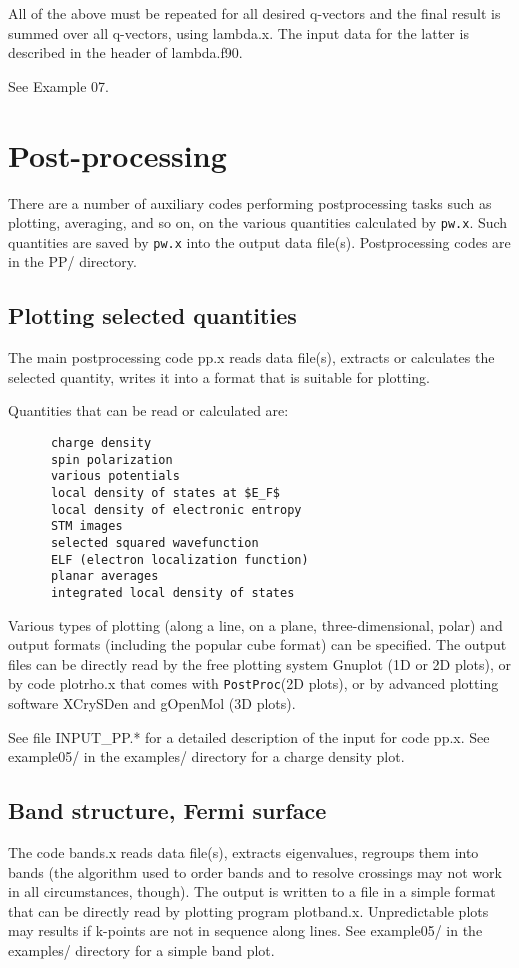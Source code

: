 \documentclass[12pt,a4paper]{article}
\def\pw.x{\texttt{pw.x}}
\def\PostProc{\texttt{PostProc}}
\begin{document}
All of the above must be repeated for all desired q-vectors and the final
result is summed over all q-vectors, using lambda.x. The input
data for the latter is described in the header of lambda.f90.

See Example 07.

\section{Post-processing}

There are a number of auxiliary codes performing postprocessing tasks such
as plotting, averaging, and so on, on the various quantities calculated by
\pw.x. Such quantities are saved by \pw.x into the output data file(s). 
Postprocessing codes are in the PP/ directory.

\subsection{Plotting selected quantities}
  
The main postprocessing code pp.x reads data file(s), extracts or calculates 
the selected quantity, writes it into a format that is suitable for plotting.

Quantities that can be read or calculated are:
\begin{verbatim}
      charge density
      spin polarization
      various potentials
      local density of states at $E_F$
      local density of electronic entropy
      STM images
      selected squared wavefunction
      ELF (electron localization function)
      planar averages
      integrated local density of states
\end{verbatim}
Various types of plotting (along a line, on a plane, three-dimensional, polar)
and output formats (including the popular cube format) can be specified.
The output files can be directly read by the free plotting system Gnuplot
(1D or 2D plots), or by code plotrho.x that comes with \PostProc (2D plots),
or by advanced plotting software XCrySDen and gOpenMol (3D plots).

See file INPUT\_PP.* for a detailed description of the input for code pp.x.
See example05/ in the examples/ directory for a charge density plot.

\subsection{Band structure, Fermi surface}

The code bands.x reads data file(s), extracts eigenvalues,
regroups them into bands (the algorithm used to order bands and to resolve
crossings may not work in all circumstances, though). The output is written
to a file in a simple format that can be directly read by plotting program
plotband.x. Unpredictable plots may results if k-points are not in sequence
along lines. See example05/ in the examples/ directory for a simple band plot.
\end{document}
